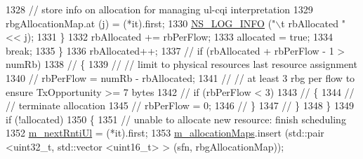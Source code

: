 \begin{DoxyCode}
1328                                         \textcolor{comment}{// store info on allocation for managing ul-cqi interpretation}
1329                                         rbgAllocationMap.at (j) = (*it).first;
1330                                         \hyperlink{group__logging_gafbd73ee2cf9f26b319f49086d8e860fb}{NS\_LOG\_INFO} (\textcolor{stringliteral}{"\(\backslash\)t rbAllocated "} << j);
1331                                 \}
1332                                 rbAllocated += rbPerFlow;
1333                                 allocated = \textcolor{keyword}{true};
1334                                 \textcolor{keywordflow}{break};
1335                         \}
1336                         rbAllocated++;
1337                         \textcolor{comment}{//                                      if (rbAllocated + rbPerFlow - 1 > numRb)}
1338                         \textcolor{comment}{//                                      \{}
1339                         \textcolor{comment}{//                                              // limit to physical resources last
       resource assignment}
1340                         \textcolor{comment}{//                                              rbPerFlow = numRb - rbAllocated;}
1341                         \textcolor{comment}{//                                              // at least 3 rbg per flow to
       ensure TxOpportunity >= 7 bytes}
1342                         \textcolor{comment}{//                                              if (rbPerFlow < 3)}
1343                         \textcolor{comment}{//                                              \{}
1344                         \textcolor{comment}{//                                                      // terminate allocation}
1345                         \textcolor{comment}{//                                                      rbPerFlow = 0;}
1346                         \textcolor{comment}{//                                              \}}
1347                         \textcolor{comment}{//                                      \}}
1348                 \}
1349                 \textcolor{keywordflow}{if} (!allocated)
1350                 \{
1351                         \textcolor{comment}{// unable to allocate new resource: finish scheduling}
1352                         \hyperlink{classns3_1_1MmWaveRrMacScheduler_ac9c27bbc2f828923b14cbc3b6ed5be57}{m\_nextRntiUl} = (*it).first;
1353                         \hyperlink{classns3_1_1MmWaveRrMacScheduler_aac1f8a8418e80a70a78e8fb710697588}{m\_allocationMaps}.insert (std::pair <uint32\_t, std::vector
       <uint16\_t> > (sfn, rbgAllocationMap));

\end{DoxyCode}

